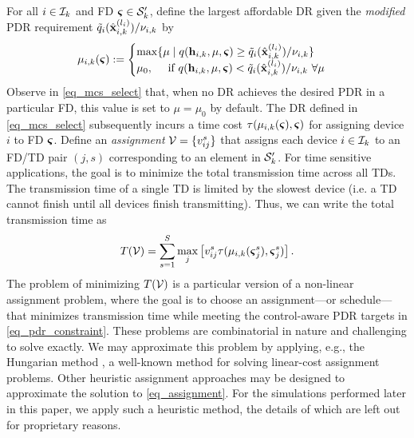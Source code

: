 For all $i \in {\ensuremath{\mathcal I}}_k$ and FD $\boldsymbol{\varsigma} \in {\ensuremath{\mathcal S}}'_k$, define the largest affordable DR given the \emph{modified} PDR requirement ${\tilde q}_i({\hat{\mathbf x} }^{(l_i)}_{i,k})/\nu_{i,k}$ by
 \begin{align}\label{eq_mcs_select}
 \mu_{i,k}(\boldsymbol{\varsigma}) := \begin{cases}
 \max \{\mu \mid q({\mathbf h}_{i,k},\mu,\boldsymbol{\varsigma}) \geq {\ensuremath{\tilde q}}_i({\hat{\mathbf x} }^{(l_i)}_{i,k})/\nu_{i,k}\} \\
 \mu_0,\quad  \text{ if } q({\mathbf h}_{i,k},\mu,\boldsymbol{\varsigma}) < {\tilde q}_i({\hat{\mathbf x} }^{(l_i)}_{i,k})/\nu_{i,k} \ \forall \mu
 \end{cases}
 \end{align}
Observe in \eqref{eq_mcs_select} that, when no DR achieves the desired PDR in a particular FD, this value is set to $\mu=\mu_0$ by default.  The DR defined in \eqref{eq_mcs_select} subsequently incurs a time cost $\tau(\mu_{i,k}(\boldsymbol{\varsigma}), \boldsymbol{\varsigma})$ for assigning device $i$ to FD $\boldsymbol{\varsigma}$. Define an \emph{assignment} ${\mathcal V}=\{v_{ij}^s\}$ that assigns each device $i \in {\ensuremath{\mathcal I}}_k$ to an FD/TD pair $(j,s)$ corresponding to an element in ${\mathcal S}'_k$.  For time sensitive applications, the goal is to minimize the total transmission time across all TDs. The transmission time of a single TD is limited by the slowest device (i.e. a TD cannot finish until all devices finish transmitting). Thus, we can write the total transmission time as 
%
\begin{align}\label{eq_assignment}
T({\mathcal V}) = \sum_{s=1}^S \max_{j} \left[v^s_{ij} \tau(\mu_{i,k}(\boldsymbol{\varsigma}^s_j), \boldsymbol{\varsigma}_j^s)\right].
\end{align}
% 
The problem of minimizing $T({\mathcal V})$ is a particular version of a non-linear assignment problem, where the goal is to choose an assignment---or schedule---that minimizes transmission time while meeting the control-aware PDR targets in \eqref{eq_pdr_constraint}. These problems are combinatorial in nature and challenging to solve exactly. We may approximate this problem by applying, e.g., the Hungarian method \cite{kuhn1955hungarian}, a well-known method for solving linear-cost assignment problems. Other heuristic assignment approaches may be designed to approximate the solution to \eqref{eq_assignment}. For the simulations performed later in this paper, we apply such a heuristic method, the details of which are left out for proprietary reasons.





